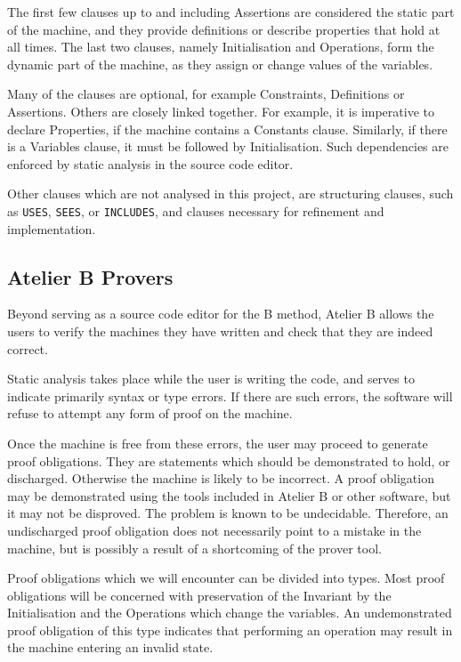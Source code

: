 \documentclass[12pt,journal,duplex]{IEEEtran}
\begin{document}
	The first few clauses up to and including Assertions are considered the static part of the machine, and they provide definitions or describe properties that hold at all times. The last two clauses, namely Initialisation and Operations, form the dynamic part of the machine, as they assign or change values of the variables.

	Many of the clauses are optional, for example Constraints, Definitions or Assertions. Others are closely linked together. For example, it is imperative to declare Properties, if the machine contains a Constants clause. Similarly, if there is a Variables clause, it must be followed by Initialisation. Such dependencies are enforced by static analysis in the source code editor.

	Other clauses which are not analysed in this project, are structuring clauses, such as \texttt{USES}, \texttt{SEES}, or \texttt{INCLUDES}, and clauses necessary for refinement and implementation.

	\subsection{Atelier B Provers}
	Beyond serving as a source code editor for the B method, Atelier B allows the users to verify the machines they have written and check that they are indeed correct. 

	Static analysis takes place while the user is writing the code, and serves to indicate primarily syntax or type errors. If there are such errors, the software will refuse to attempt any form of proof on the machine.

	Once the machine is free from these errors, the user may proceed to generate proof obligations. They are statements which should be demonstrated to hold, or discharged. Otherwise the machine is likely to be incorrect. A proof obligation may be demonstrated using the tools included in Atelier B or other software, but it may not be disproved. The problem is known to be undecidable\cite{sipser}. Therefore, an undischarged proof obligation does not necessarily point to a mistake in the machine, but is possibly a result of a shortcoming of the prover tool.

	Proof obligations which we will encounter can be divided into types. Most proof obligations will be concerned with preservation of the Invariant by the Initialisation and the Operations which change the variables. An undemonstrated proof obligation of this type indicates that performing an operation may result in the machine entering an invalid state.
\end{document}
